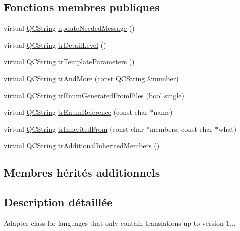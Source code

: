 \subsection*{Fonctions membres publiques}
\begin{DoxyCompactItemize}
\item 
virtual \hyperlink{class_q_c_string}{Q\+C\+String} \hyperlink{class_translator_adapter__1__8__0_a47cedb130d9a178d9c632584d4f2abec}{update\+Needed\+Message} ()
\item 
virtual \hyperlink{class_q_c_string}{Q\+C\+String} \hyperlink{class_translator_adapter__1__8__0_a4da9c471e95968f4c6f67ce92e9d212c}{tr\+Detail\+Level} ()
\item 
virtual \hyperlink{class_q_c_string}{Q\+C\+String} \hyperlink{class_translator_adapter__1__8__0_a2614ce073bd4d9a8b809b76f583e7418}{tr\+Template\+Parameters} ()
\item 
virtual \hyperlink{class_q_c_string}{Q\+C\+String} \hyperlink{class_translator_adapter__1__8__0_a091b619b50fdf129ac17d5aac58bdaa0}{tr\+And\+More} (const \hyperlink{class_q_c_string}{Q\+C\+String} \&number)
\item 
virtual \hyperlink{class_q_c_string}{Q\+C\+String} \hyperlink{class_translator_adapter__1__8__0_af5e54cf6d212a780eaa83dc74cdf1a57}{tr\+Enum\+Generated\+From\+Files} (\hyperlink{qglobal_8h_a1062901a7428fdd9c7f180f5e01ea056}{bool} single)
\item 
virtual \hyperlink{class_q_c_string}{Q\+C\+String} \hyperlink{class_translator_adapter__1__8__0_a983c0f41b5a8fd4078045ef28a73ba7e}{tr\+Enum\+Reference} (const char $\ast$name)
\item 
virtual \hyperlink{class_q_c_string}{Q\+C\+String} \hyperlink{class_translator_adapter__1__8__0_a932515e9726f48018b93f49bfd2dba6a}{tr\+Inherited\+From} (const char $\ast$members, const char $\ast$what)
\item 
virtual \hyperlink{class_q_c_string}{Q\+C\+String} \hyperlink{class_translator_adapter__1__8__0_abfa3bd866a75cec56e75751e8ab8d20d}{tr\+Additional\+Inherited\+Members} ()
\end{DoxyCompactItemize}
\subsection*{Membres hérités additionnels}


\subsection{Description détaillée}
Adapter class for languages that only contain translations up to version 1... 

